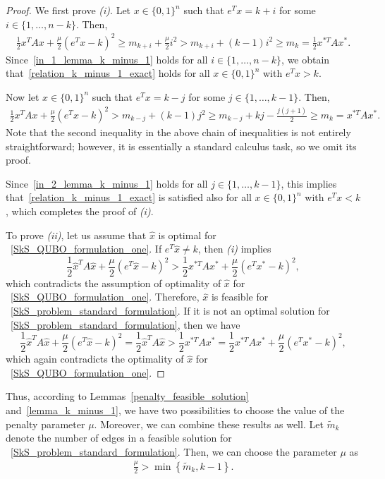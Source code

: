 \documentclass{article}
\begin{document}
\begin{proof}
We first prove {\it (i)}.
Let $x \in \{0, 1\}^n$ such that $e^T x = k + i$ for some $i \in \{1, \ldots, n-k\}$. Then, 
\begin{align}\label{in_1_lemma_k_minus_1}
\frac{1}{2} x^T A x + \frac{\mu}{2}(e^Tx - k)^2 \geq m_{k+i} + \frac{\mu}{2} i^2 > m_{k+i} +  (k-1) i^2 \geq m_k = \frac{1}{2} x^{*T} A x^*.
\end{align}
 Since~\eqref{in_1_lemma_k_minus_1} holds for all $i \in \{1, \ldots, n-k\}$, we obtain that~\eqref{relation_k_minus_1_exact} holds for all $x \in \{0, 1\}^n$ with $e^Tx > k$. 

Now let $x \in \{0, 1\}^n$ such that $e^T x = k - j$ for some $j \in \{1, \ldots, k - 1\}$. Then,
\begin{align}\label{in_2_lemma_k_minus_1}
\frac{1}{2} x^T A x + \frac{\mu}{2}(e^Tx - k)^2 > m_{k - j} + (k-1) j^2 \geq m_{k-j} + kj - \frac{j(j+1)}{2} \geq m_k = x^{*T} A x^*.
\end{align}
Note that the second inequality in the above chain of inequalities is not entirely straightforward; however, it is essentially a standard calculus task, so we omit its proof.

Since~\eqref{in_2_lemma_k_minus_1} holds for all $j \in \{1, \ldots, k-1\}$, this implies that~\eqref{relation_k_minus_1_exact} is satisfied also for all $x \in \{0, 1\}^n$ with $e^Tx < k$, which completes the proof of {\it (i)}.

To prove {\it (ii)}, let us assume that $\hat x$ is optimal for ~\eqref{SkS_QUBO_formulation_one}. If $e^T\hat x\neq k$, then {\it (i)} implies
$$\frac{1}{2} \hat x^T A \hat x + \frac{\mu}{2}(e^T\hat x - k)^2 > \frac{1}{2} x^{*T} A x^* +
\frac{\mu}{2}(e^{T} x^*- k)^2,$$
which contradicts the assumption of optimality of $\hat x$ for ~\eqref{SkS_QUBO_formulation_one}.
Therefore, $\hat x$ is feasible for ~\eqref{SkS_problem_standard_formulation}.
If it is not an optimal solution for ~\eqref{SkS_problem_standard_formulation}, then 
we have
$$\frac{1}{2} \hat x^T A \hat x+\frac{\mu}{2}(e^T\hat x - k)^2=\frac{1}{2} \hat x^T A \hat x > \frac{1}{2} x^{*T} A x^*=\frac{1}{2} x^{*T} A x^* +
\frac{\mu}{2}(e^{T} x^*- k)^2,$$
which again contradicts the optimality  of $\hat x$ for ~\eqref{SkS_QUBO_formulation_one}.
\end{proof}

Thus, according to Lemmas~\ref{penalty_feasible_solution} and~\ref{lemma_k_minus_1}, we have two possibilities to choose the value of the penalty parameter $\mu$. Moreover, we can combine these results as well. Let $\tilde{m}_k$ denote the number of edges in a feasible solution for ~\eqref{SkS_problem_standard_formulation}. Then, we can choose the parameter $\mu$ as
\begin{align}\label{choose_quadratic_penalty}
\frac{\mu}{2} > \min \left\{ \tilde{m}_k, k - 1 \right\}.
\end{align}
\end{document}
